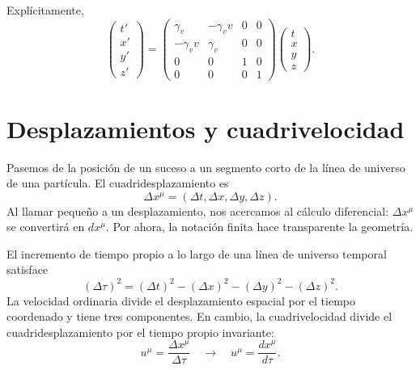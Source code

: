\begin{classroomqa}
\end{classroomqa}

Explícitamente,
\begin{equation}
\begin{pmatrix}
t'\\x'\\y'\\z'
\end{pmatrix}
=
\begin{pmatrix}
\gamma_v&-\gamma_v v&0&0\\
-\gamma_v v&\gamma_v&0&0\\
0&0&1&0\\
0&0&0&1
\end{pmatrix}
\begin{pmatrix}
t\\x\\y\\z
\end{pmatrix}.
\label{eq:sr2-boost-matrix}
\end{equation}

\section{Desplazamientos y cuadrivelocidad}

Pasemos de la posición de un suceso a un segmento corto de la línea de universo de una partícula. El cuadridesplazamiento es
\begin{equation}
\Delta x^\mu
=(\Delta t,\Delta x,\Delta y,\Delta z).
\end{equation}
Al llamar pequeño a un desplazamiento, nos acercamos al cálculo diferencial: \(\Delta x^\mu\) se convertirá en \(dx^\mu\). Por ahora, la notación finita hace transparente la geometría.

El incremento de tiempo propio a lo largo de una línea de universo temporal satisface
\begin{equation}
(\Delta\tau)^2
=(\Delta t)^2-(\Delta x)^2-(\Delta y)^2-(\Delta z)^2.
\label{eq:sr2-proper-increment}
\end{equation}
La velocidad ordinaria divide el desplazamiento espacial por el tiempo coordenado y tiene tres componentes. En cambio, la cuadrivelocidad divide el cuadridesplazamiento por el tiempo propio invariante:
\begin{equation}
u^\mu
=\frac{\Delta x^\mu}{\Delta\tau}
\quad\longrightarrow\quad
\boxed{
u^\mu=\frac{dx^\mu}{d\tau}
}.
\label{eq:sr2-four-velocity}
\end{equation}

